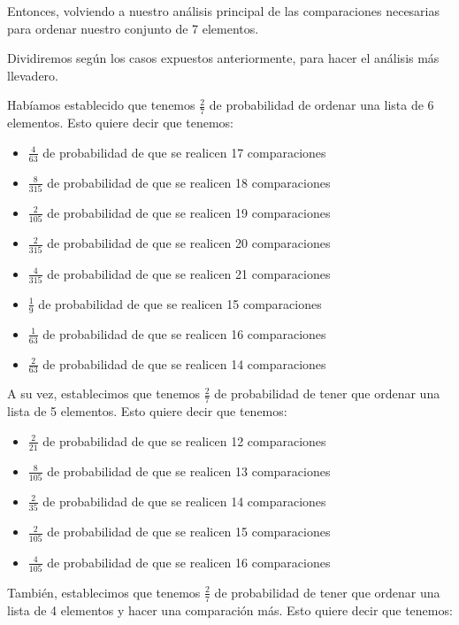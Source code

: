 \documentclass[11pt]{article}
\begin{document}
Entonces, volviendo a nuestro análisis principal de las comparaciones necesarias para ordenar nuestro conjunto de 7 elementos. 

Dividiremos según los casos expuestos anteriormente, para hacer el análisis más llevadero.

Habíamos establecido que tenemos $\frac{2}{7}$ de probabilidad de ordenar una lista de 6 elementos. Esto quiere decir que tenemos: 

\begin{itemize}
    \item $\frac{4}{63}$ de probabilidad de que se realicen 17 comparaciones
    \item $\frac{8}{315}$ de probabilidad de que se realicen 18 comparaciones
    \item $\frac{2}{105}$ de probabilidad de que se realicen 19 comparaciones
    \item $\frac{2}{315}$ de probabilidad de que se realicen 20 comparaciones
    \item $\frac{4}{315}$ de probabilidad de que se realicen 21 comparaciones
    \item $\frac{1}{9}$ de probabilidad de que se realicen 15 comparaciones
    \item $\frac{1}{63}$ de probabilidad de que se realicen 16 comparaciones
    \item $\frac{2}{63}$ de probabilidad de que se realicen 14 comparaciones
\end{itemize}

A su vez, establecimos que tenemos $\frac{2}{7}$ de probabilidad de tener que ordenar una lista de 5 elementos. Esto quiere decir que tenemos: 

\begin{itemize}
    \item $\frac{2}{21}$ de probabilidad de que se realicen 12 comparaciones
    \item $\frac{8}{105}$ de probabilidad de que se realicen 13 comparaciones
    \item $\frac{2}{35}$ de probabilidad de que se realicen 14 comparaciones
    \item $\frac{2}{105}$ de probabilidad de que se realicen 15 comparaciones
    \item $\frac{4}{105}$ de probabilidad de que se realicen 16 comparaciones
\end{itemize}

También, establecimos que tenemos $\frac{2}{7}$ de probabilidad de tener que ordenar una lista de 4 elementos y hacer una comparación más. Esto quiere decir que tenemos: 
\end{document}
